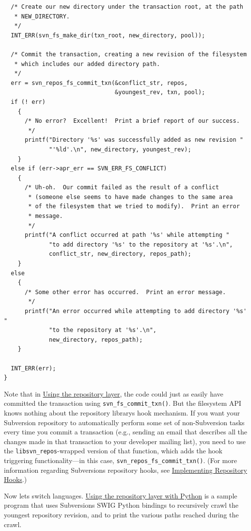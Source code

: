 \begin{verbatim}
  /* Create our new directory under the transaction root, at the path
   * NEW_DIRECTORY. 
   */
  INT_ERR(svn_fs_make_dir(txn_root, new_directory, pool));

  /* Commit the transaction, creating a new revision of the filesystem
   * which includes our added directory path.
   */
  err = svn_repos_fs_commit_txn(&conflict_str, repos, 
                                &youngest_rev, txn, pool);
  if (! err)
    {
      /* No error?  Excellent!  Print a brief report of our success.
       */
      printf("Directory '%s' was successfully added as new revision "
             "'%ld'.\n", new_directory, youngest_rev);
    }
  else if (err->apr_err == SVN_ERR_FS_CONFLICT)
    {
      /* Uh-oh.  Our commit failed as the result of a conflict
       * (someone else seems to have made changes to the same area 
       * of the filesystem that we tried to modify).  Print an error
       * message.
       */
      printf("A conflict occurred at path '%s' while attempting "
             "to add directory '%s' to the repository at '%s'.\n", 
             conflict_str, new_directory, repos_path);
    }
  else
    {
      /* Some other error has occurred.  Print an error message.
       */
      printf("An error occurred while attempting to add directory '%s' "
             "to the repository at '%s'.\n", 
             new_directory, repos_path);
    }

  INT_ERR(err);
} 
\end{verbatim}

Note that in \hyperref[svn.developer.layerlib.repos.ex-1]{Using the
repository layer}, the code could just as easily have committed the
transaction using \texttt{svn\_fs\_commit\_txn()}. But the filesystem
API knows nothing about the repository library\textquotesingle s hook
mechanism. If you want your Subversion repository to automatically
perform some set of non-Subversion tasks every time you commit a
transaction (e.g., sending an email that describes all the changes made
in that transaction to your developer mailing list), you need to use the
\texttt{libsvn\_repos}-wrapped version of that function, which adds the
hook triggering functionality---in this case,
\texttt{svn\_repos\_fs\_commit\_txn()}. (For more information regarding
Subversion\textquotesingle s repository hooks, see
\hyperref[svn.reposadmin.hooks]{Implementing Repository Hooks}.)

Now let\textquotesingle s switch languages.
\hyperref[svn.developer.usingapi.otherlangs.ex-1]{Using the repository
layer with Python} is a sample program that uses
Subversion\textquotesingle s SWIG Python bindings to recursively crawl
the youngest repository revision, and to print the various paths reached
during the crawl.

